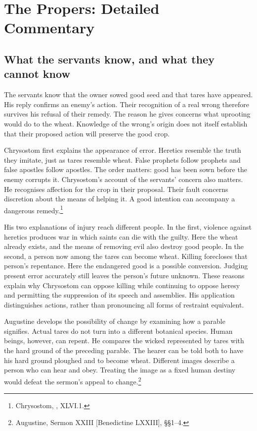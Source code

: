 \section{The Propers: Detailed Commentary}
\subsection{What the servants know, and what they cannot know}
The servants know that the owner sowed good seed and that tares have
appeared. His reply confirms an enemy's action. Their recognition of a
real wrong therefore survives his refusal of their remedy. The reason
he gives concerns what uprooting would do to the wheat. Knowledge of
the wrong's origin does not itself establish that their proposed action
will preserve the good crop.

Chrysostom first explains the appearance of error. Heretics resemble the
truth they imitate, just as tares resemble wheat. False prophets follow
prophets and false apostles follow apostles. The order matters: good
has been sown before the enemy corrupts it. Chrysostom's account of
the servants' concern also matters. He recognises affection for the
crop in their proposal. Their fault concerns discretion about the
means of helping it. A good intention can accompany a dangerous
remedy.\footnote{Chrysostom, , XLVI.1.}

His two explanations of injury reach different people. In the first,
violence against heretics produces war in which saints can die with
the guilty. Here the wheat already exists, and the means of removing
evil also destroy good people. In the second, a person now among the
tares can become wheat. Killing forecloses that person's repentance.
Here the endangered good is a possible conversion. Judging present
error accurately still leaves the person's future unknown. These
reasons explain why Chrysostom can oppose killing while continuing
to oppose heresy and permitting the suppression of its speech and
assemblies. His application distinguishes actions, rather than
pronouncing all forms of restraint equivalent.

Augustine develops the possibility of change by examining how a
parable signifies. Actual tares do not turn into a different botanical
species. Human beings, however, can repent. He compares the wicked
represented by tares with the hard ground of the preceding parable.
The hearer can be told both to have his hard ground ploughed and to
become wheat. Different images describe a person who can hear and
obey. Treating the image as a fixed human destiny would defeat the
sermon's appeal to change.\footnote{Augustine, Sermon XXIII
[Benedictine LXXIII], §§1--4.}

